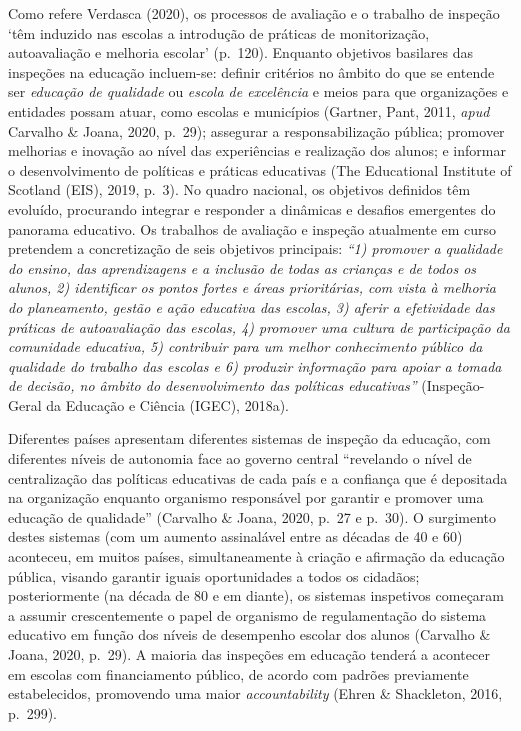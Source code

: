 \documentclass[
]{book}
\begin{document}
Como refere Verdasca (2020), os processos de avaliação e o trabalho de inspeção `têm induzido nas escolas a introdução de práticas de monitorização, autoavaliação e melhoria escolar' (p.~120). Enquanto objetivos basilares das inspeções na educação incluem-se: definir critérios no âmbito do que se entende ser \emph{educação de qualidade} ou \emph{escola de excelência} e meios para que organizações e entidades possam atuar, como escolas e municípios (Gartner, Pant, 2011, \emph{apud} Carvalho \& Joana, 2020, p.~29); assegurar a responsabilização pública; promover melhorias e inovação ao nível das experiências e realização dos alunos; e informar o desenvolvimento de políticas e práticas educativas (The Educational Institute of Scotland (EIS), 2019, p.~3). No quadro nacional, os objetivos definidos têm evoluído, procurando integrar e responder a dinâmicas e desafios emergentes do panorama educativo. Os trabalhos de avaliação e inspeção atualmente em curso pretendem a concretização de seis objetivos principais: \emph{``1) promover a qualidade do ensino, das aprendizagens e a inclusão de todas as crianças e de todos os alunos, 2) identificar os pontos fortes e áreas prioritárias, com vista à melhoria do planeamento, gestão e ação educativa das escolas, 3) aferir a efetividade das práticas de autoavaliação das escolas, 4) promover uma cultura de participação da comunidade educativa, 5) contribuir para um melhor conhecimento público da qualidade do trabalho das escolas e 6) produzir informação para apoiar a tomada de decisão, no âmbito do desenvolvimento das políticas educativas''} (Inspeção-Geral da Educação e Ciência (IGEC), 2018a).

Diferentes países apresentam diferentes sistemas de inspeção da educação, com diferentes níveis de autonomia face ao governo central ``revelando o nível de centralização das políticas educativas de cada país e a confiança que é depositada na organização enquanto organismo responsável por garantir e promover uma educação de qualidade'' (Carvalho \& Joana, 2020, p.~27 e p.~30). O surgimento destes sistemas (com um aumento assinalável entre as décadas de 40 e 60) aconteceu, em muitos países, simultaneamente à criação e afirmação da educação pública, visando garantir iguais oportunidades a todos os cidadãos; posteriormente (na década de 80 e em diante), os sistemas inspetivos começaram a assumir crescentemente o papel de organismo de regulamentação do sistema educativo em função dos níveis de desempenho escolar dos alunos (Carvalho \& Joana, 2020, p.~29). A maioria das inspeções em educação tenderá a acontecer em escolas com financiamento público, de acordo com padrões previamente estabelecidos, promovendo uma maior \emph{accountability} (Ehren \& Shackleton, 2016, p.~299).
\end{document}
